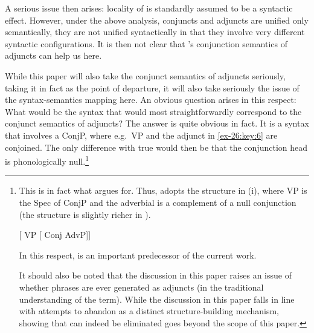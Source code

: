 \documentclass[output=paper]{langsci/langscibook}
\begin{document}
\label{ex-26:key:7}
\z

\label{ex-26:key:8}
\z

A serious issue then arises: locality of  is standardly assumed to be a
syntactic effect. However, under the above analysis, conjuncts and adjuncts are
unified only semantically, they are not unified syntactically in that they
involve very different syntactic configurations. It is then not clear that
\citeauthor{Higginbotham1985}’s conjunction semantics of adjuncts can help us
here.

While this paper will also take the conjunct semantics of adjuncts seriously,
taking it in fact as the point of departure, it will also take seriously the
issue of the syntax-semantics mapping here. An obvious question arises in this
respect: What would be the syntax that would most straightforwardly correspond
to the conjunct semantics of adjuncts? The answer is quite obvious in fact. It
is a syntax that involves a ConjP, where e.g.\ VP and the adjunct in \eqref{ex-26:key:6} are
conjoined. The only difference with true  would then be that the
conjunction head is phonologically null.\footnote{This is in fact what
    \textcite{Progovac1998,Progovac1999} argues for. Thus, \citet{Progovac1998}
    adopts the structure in (i), where VP is the Spec of ConjP and the
    adverbial is a complement of a null conjunction (the structure is slightly
    richer in \citealt{Progovac1999}).

    \begin{exe}
         {}[ VP [ Conj AdvP]]
    \end{exe}

    In this respect, \textcite{Progovac1998,Progovac1999} is an important
    predecessor of the current work.

    It should also be noted that the discussion in this paper raises an issue
    of whether phrases are ever generated as adjuncts (in the traditional
    understanding of the term).  While the discussion in this paper falls in
    line with attempts to abandon  as a distinct structure-building
mechanism, showing that  can indeed be eliminated goes beyond the
scope of this paper.}
\end{document}
